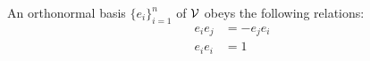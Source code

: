 \begin{corollary}\label{c:orthonormal-bases}
	An orthonormal basis $\{e_i\}_{i=1}^n$ of $\mathcal{V}$ obeys the following relations:
	\begin{align*}
		e_ie_j &= -e_je_i \\
		e_ie_i &= 1
	\end{align*}
\end{corollary}
